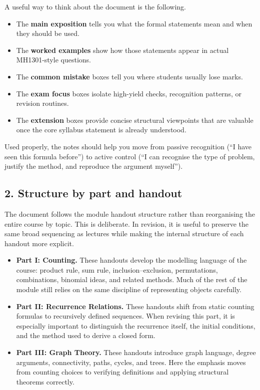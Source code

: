 \documentclass[12pt]{article}
\begin{document}
A useful way to think about the document is the following.
\begin{itemize}[leftmargin=*]
    \item The \textbf{main exposition} tells you what the formal statements mean and when they should be used.
    \item The \textbf{worked examples} show how those statements appear in actual MH1301-style questions.
    \item The \textbf{common mistake} boxes tell you where students usually lose marks.
    \item The \textbf{exam focus} boxes isolate high-yield checks, recognition patterns, or revision routines.
    \item The \textbf{extension} boxes provide concise structural viewpoints that are valuable once the core syllabus statement is already understood.
\end{itemize}

Used properly, the notes should help you move from passive recognition (``I have seen this formula before'') to active control (``I can recognise the type of problem, justify the method, and reproduce the argument myself'').

\subsection*{2. Structure by part and handout}

The document follows the module handout structure rather than reorganising the entire course by topic. This is deliberate. In revision, it is useful to preserve the same broad sequencing as lectures while making the internal structure of each handout more explicit.

\begin{itemize}[leftmargin=*]
    \item \textbf{Part I: Counting.} These handouts develop the modelling language of the course: product rule, sum rule, inclusion--exclusion, permutations, combinations, binomial ideas, and related methods. Much of the rest of the module still relies on the same discipline of representing objects carefully.
    \item \textbf{Part II: Recurrence Relations.} These handouts shift from static counting formulas to recursively defined sequences. When revising this part, it is especially important to distinguish the recurrence itself, the initial conditions, and the method used to derive a closed form.
    \item \textbf{Part III: Graph Theory.} These handouts introduce graph language, degree arguments, connectivity, paths, cycles, and trees. Here the emphasis moves from counting choices to verifying definitions and applying structural theorems correctly.
\end{itemize}
\end{document}
